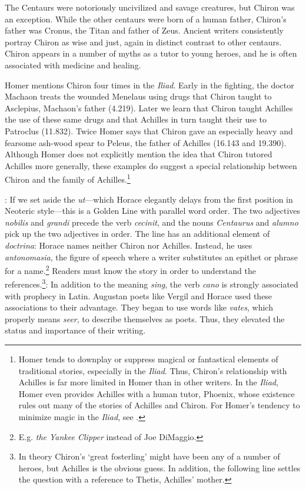 The Centaurs were notoriously uncivilized and savage creatures, but Chiron was an exception.  While the other centaurs were born of a human father, Chiron's father was Cronus, the Titan and father of Zeus.  Ancient writers consistently portray Chiron as wise and just, again in distinct contrast to other centaurs.  Chiron appears in a number of myths as a tutor to young heroes, and he is often associated with medicine and healing.

Homer mentions Chiron four times in the \textit{Iliad}.  Early in the fighting, the doctor Machaon treats the wounded Menelaus using drugs that Chiron taught to Asclepius, Machaon's father (4.219).  Later we learn that Chiron taught Achilles the use of these same drugs and that Achilles in turn taught their use to Patroclus (11.832).  Twice Homer says that Chiron gave an especially heavy and fearsome ash-wood spear to Peleus, the father of Achilles (16.143 and 19.390).  Although Homer does not explicitly mention the idea that Chiron tutored Achilles more generally, these examples do suggest a special relationship between Chiron and the family of Achilles.\footnote{Homer tends to downplay or suppress magical or fantastical elements of traditional stories, especially in the \textit{Iliad}. Thus, Chiron's relationship with Achilles is far more limited in Homer than in other writers.  In the \textit{Iliad}, Homer even provides Achilles with a human tutor, Phoenix, whose existence rules out many of the stories of Achilles and Chiron.  For Homer's tendency to minimize magic in the \textit{Iliad}, see \citet[165 ff.]{griffin1983}.}


: If we set aside the \textit{ut}---which Horace elegantly delays from the first position in Neoteric style---this is a Golden Line with parallel word order.  The two adjectives \textit{nobilis} and \textit{grandi} precede the verb \textit{cecinit}, and the nouns \textit{Centaurus} and \textit{alumno} pick up the two adjectives in order.  The line has an additional element of \textit{doctrina}: Horace names neither Chiron nor Achilles.  Instead, he uses \textit{antonomasia}, the figure of speech where a writer substitutes an epithet or phrase for a name.\footnote{E.g. \textit{the Yankee Clipper} instead of Joe DiMaggio.} Readers must know the story in order to understand the references.\footnote{In theory Chiron's `great fosterling' might have been any of a number of heroes, but Achilles is the obvious guess.  In addition, the following line settles the question with a reference to Thetis, Achilles' mother.}\indent{}: In addition to the meaning \textit{sing}, the verb \textit{cano} is strongly associated with prophecy in Latin.  Augustan poets like Vergil and Horace used these associations to their advantage.  They began to use words like \textit{vates}, which properly means \textit{seer}, to describe themselves as poets.  Thus, they elevated the status and importance of their writing.

